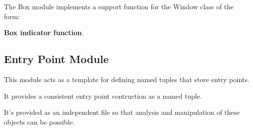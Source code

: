 \documentclass[letterpaper,10pt,english]{sphinxmanual}
\begin{document}
The Box module implements a support function for the Window class of the form:

\textbf{Box indicator function}.


\subsection{Entry Point Module}
\label{applications/applications.doc:entry-point-module}\label{applications/applications.doc:module-entryPoints}
This module acts as a template for defining named tuples that store entry points.

It provides a consistent entry point contruction as a named tuple.

It's provided as an independent file so that analysis and manipulation of these objects can be possible.
\end{document}
